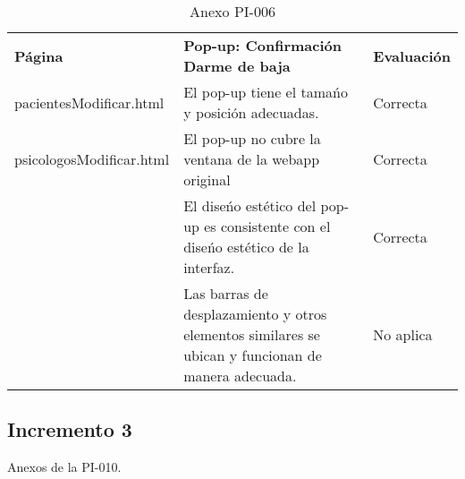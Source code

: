 \begin{table}[htpb]
\centering
\begin{tabularx}{\textwidth}{|l|X|l|}
\hline
\rowcolor[gray]{0.9}\multicolumn{3}{|l|}{\textbf{Anexo PI-006}}                                                                                                  \\ \hline
\textbf{Página}        & \textbf{Pop-up: Confirmación Darme de baja}                                                      & \textbf{Evaluación} \\ \hline
pacientesModificar.html  & El pop-up tiene el tamańo y posición adecuadas.                                                    & Correcta              \\ \cline{2-3} 
psicologosModificar.html & El pop-up no cubre la ventana de la webapp original                                                & Correcta              \\ \cline{2-3} 
                         & El diseńo estético del pop-up es consistente con el diseńo estético de la interfaz.                & Correcta              \\ \cline{2-3} 
                         & Las barras de desplazamiento y otros elementos similares se ubican y funcionan de manera adecuada. & No aplica \\ \hline   
\end{tabularx}
\caption{Anexo PI-006}
\end{table}

\clearpage

\subsection{Incremento 3}

Anexos de la PI-010.


